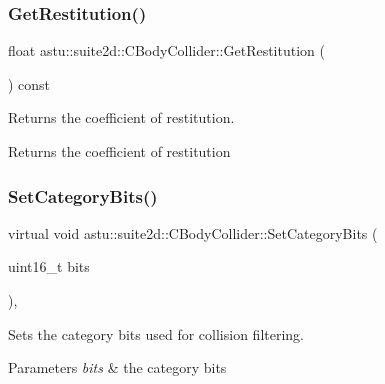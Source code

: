 \subsubsection{\texorpdfstring{Get\+Restitution()}{GetRestitution()}}
{\footnotesize\ttfamily float astu\+::suite2d\+::\+C\+Body\+Collider\+::\+Get\+Restitution (\begin{DoxyParamCaption}{ }\end{DoxyParamCaption}) const\hspace{0.3cm}{\ttfamily [inline]}}

Returns the coefficient of restitution.

\begin{DoxyReturn}{Returns}
the coefficient of restitution 
\end{DoxyReturn}
\mbox{\label{classastu_1_1suite2d_1_1CBodyCollider_af6e02b7f4a1bd613303e0d04518e790b}} 
\subsubsection{\texorpdfstring{Set\+Category\+Bits()}{SetCategoryBits()}}
{\footnotesize\ttfamily virtual void astu\+::suite2d\+::\+C\+Body\+Collider\+::\+Set\+Category\+Bits (\begin{DoxyParamCaption}\item[{uint16\+\_\+t}]{bits }\end{DoxyParamCaption})\hspace{0.3cm}{\ttfamily [inline]}, {\ttfamily [virtual]}}

Sets the category bits used for collision filtering.


\begin{DoxyParams}{Parameters}
{\em bits} & the category bits \\
\hline
\end{DoxyParams}
\mbox{\label{classastu_1_1suite2d_1_1CBodyCollider_abad2e774affa1d966ad1b1b86c76ce51}} 
